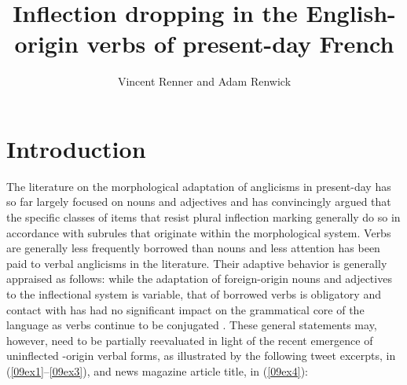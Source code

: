 \documentclass[output=paper,colorlinks,citecolor=brown]{langscibook}
\author{Vincent Renner\orcid{}\affiliation{Université Lumière Lyon 2} and Adam Renwick\orcid{}\affiliation{Université Grenoble-Alpes}}
\title{Inflection dropping in the English-origin verbs of present-day French}
\begin{document}
\maketitle

\section{Introduction} 

\begin{sloppypar}
The literature on the morphological adaptation of anglicisms in present-day  has so far largely focused on nouns and adjectives and \citet{saugera2012-english, saugera2012-inflectional} has convincingly argued that the specific classes of items that resist plural inflection marking generally do so in accordance with subrules that originate within the  morphological system. Verbs are generally less frequently borrowed than nouns \citep{tadmor2009} and less attention has been paid to verbal anglicisms in the literature. Their adaptive behavior is generally appraised as follows: while the adaptation of foreign-origin nouns and adjectives to the  inflectional system is variable, that of borrowed verbs is obligatory \citep{anastassiadissymeonidisnikolaou2011, poplack2017} and contact with  has had no significant impact on the grammatical core of the language as  verbs continue to be conjugated \citep{sauliere2014}. These general statements may, however, need to be partially reevaluated in light of the recent emergence of uninflected -origin verbal forms, as illustrated by the following tweet excerpts, in (\ref{09ex1}--\ref{09ex3}), and news magazine article title, in (\ref{09ex4}):
\end{sloppypar}
\end{document}
